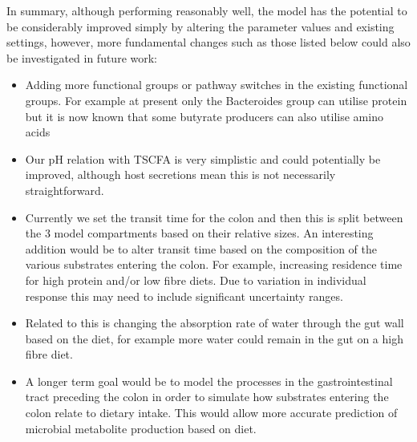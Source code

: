 \documentclass[a4paper]{article}
\begin{document}
In summary, although performing reasonably well, the model has the potential to be considerably improved simply by altering the parameter values and existing settings, however, more fundamental changes such as those listed below could also be investigated in future work:
\begin{itemize}
\item Adding more functional groups or pathway switches in the existing functional groups. For example at present only the Bacteroides group can utilise protein but it is now known that some butyrate producers can also utilise amino acids \citep{louis17}
\item Our pH relation with TSCFA is very simplistic and could potentially be improved, although host secretions mean this is not necessarily straightforward.
\item Currently we set the transit time for the colon and then this is split between the 3 model compartments based on their relative sizes. An interesting addition would be to alter transit time based on the composition of the various substrates entering the colon. For example, increasing residence time for high protein and/or low fibre diets. Due to variation in individual response this may need to include significant uncertainty ranges.
\item Related to this is changing the absorption rate of water through the gut wall based on the diet, for example more water could remain in the gut on a high fibre diet.
\item A longer term goal would be to model the processes in the gastrointestinal tract preceding the colon in order to simulate how substrates entering the colon relate to dietary intake. This would allow more accurate prediction of microbial metabolite production based on diet.

\end{itemize} 
\end{document}
